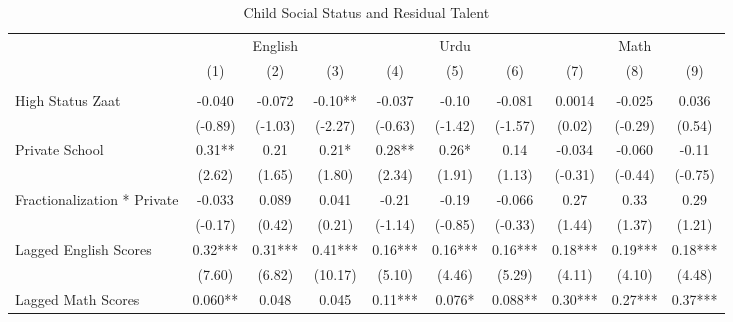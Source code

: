 \begin{sidewaystable}[htbp]\centering
\def\sym#1{\ifmmode^{#1}\else\(^{#1}\)\fi}
\caption{Child Social Status and Residual Talent\label{castesarentdumb}}
\begin{tabular}{l*{9}{c}}
\toprule
                &\multicolumn{3}{c}{English}           &\multicolumn{3}{c}{Urdu}              &\multicolumn{3}{c}{Math}              \\\cmidrule(lr){2-4}\cmidrule(lr){5-7}\cmidrule(lr){8-10}
                &\multicolumn{1}{c}{(1)}&\multicolumn{1}{c}{(2)}&\multicolumn{1}{c}{(3)}&\multicolumn{1}{c}{(4)}&\multicolumn{1}{c}{(5)}&\multicolumn{1}{c}{(6)}&\multicolumn{1}{c}{(7)}&\multicolumn{1}{c}{(8)}&\multicolumn{1}{c}{(9)}\\
                &\multicolumn{1}{c}{}&\multicolumn{1}{c}{}&\multicolumn{1}{c}{}&\multicolumn{1}{c}{}&\multicolumn{1}{c}{}&\multicolumn{1}{c}{}&\multicolumn{1}{c}{}&\multicolumn{1}{c}{}&\multicolumn{1}{c}{}\\
\midrule
High Status Zaat&   -0.040   &   -0.072   &    -0.10** &   -0.037   &    -0.10   &   -0.081   &   0.0014   &   -0.025   &    0.036   \\
                &  (-0.89)   &  (-1.03)   &  (-2.27)   &  (-0.63)   &  (-1.42)   &  (-1.57)   &   (0.02)   &  (-0.29)   &   (0.54)   \\
Private School  &     0.31** &     0.21   &     0.21*  &     0.28** &     0.26*  &     0.14   &   -0.034   &   -0.060   &    -0.11   \\
                &   (2.62)   &   (1.65)   &   (1.80)   &   (2.34)   &   (1.91)   &   (1.13)   &  (-0.31)   &  (-0.44)   &  (-0.75)   \\
Fractionalization * Private&   -0.033   &    0.089   &    0.041   &    -0.21   &    -0.19   &   -0.066   &     0.27   &     0.33   &     0.29   \\
                &  (-0.17)   &   (0.42)   &   (0.21)   &  (-1.14)   &  (-0.85)   &  (-0.33)   &   (1.44)   &   (1.37)   &   (1.21)   \\
Lagged English Scores&     0.32***&     0.31***&     0.41***&     0.16***&     0.16***&     0.16***&     0.18***&     0.19***&     0.18***\\
                &   (7.60)   &   (6.82)   &  (10.17)   &   (5.10)   &   (4.46)   &   (5.29)   &   (4.11)   &   (4.10)   &   (4.48)   \\
Lagged Math Scores&    0.060** &    0.048   &    0.045   &     0.11***&    0.076*  &    0.088** &     0.30***&     0.27***&     0.37***\\

\end{tabular}
\end{sidewaystable}
